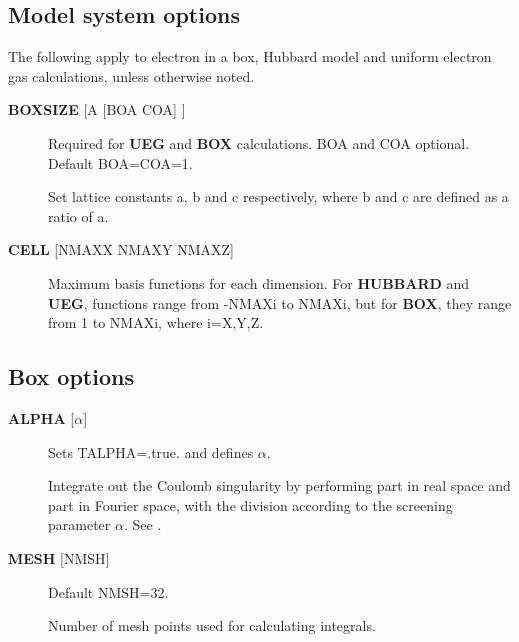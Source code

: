 \documentclass[openany,a4paper,10pt]{manual}
\begin{document}
\subsection{Model system options}

The following apply to electron in a box, Hubbard model and uniform
electron gas calculations, unless otherwise noted.
\begin{description}
\item[\textbf{BOXSIZE} {[}A {[}BOA COA{]} {]}]
Required for \textbf{UEG} and \textbf{BOX} calculations.  BOA and COA optional. Default
BOA=COA=1.

Set lattice constants a, b and c respectively, where b and c are defined
as a ratio of a.

\item[\textbf{CELL} {[}NMAXX NMAXY NMAXZ{]}]
Maximum basis functions for each dimension.  For \textbf{HUBBARD} and \textbf{UEG},
functions range from -NMAXi to NMAXi, but for \textbf{BOX}, they range from 1
to NMAXi, where i=X,Y,Z.

\end{description}


\subsection{Box options}
\begin{description}
\item[\textbf{ALPHA} {[}$\alpha${]}]
Sets TALPHA=.true. and defines $\alpha$.

Integrate out the Coulomb singularity by performing part in real
space and part in Fourier space, with the division according to the
screening parameter $\alpha$.  See \cite{TwoElBox}.

\item[\textbf{MESH} {[}NMSH{]}]
Default NMSH=32.

Number of mesh points used for calculating integrals.

\end{description}
\end{document}
